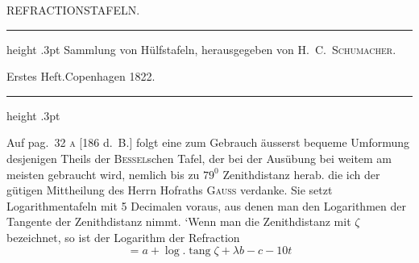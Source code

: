 \clearpage
\thispagestyle{empty}
%
\vspace*{2\baselineskip}
\begin{center}\large REFRACTIONSTAFELN.\end{center}
\begin{center}\parbox{.79\linewidth}{\centering\footnotesize\frenchspacing
\hrule height .3pt\relax\vspace{2.5pt}
Sammlung von Hülfstafeln, herausgegeben von H.\ C.\ \textsc{Schumacher}.\par
Erstes Heft.\quad Copenhagen 1822.\par
\vspace{2.5pt}\hrule height .3pt\relax
}\end{center}
\par\indent Auf pag.\ 32 \textsc{a} [186 d.\ B.] folgt eine zum Gebrauch äusserst bequeme Umformung desjenigen Theils der \textsc{Bessel}schen Tafel, der bei der Ausübung bei weitem am meisten gebraucht wird, nemlich bis zu $79^0$ Zenithdistanz herab. die ich der gütigen Mittheilung des Herrn Hofraths \textsc{Gauss} verdanke. Sie setzt Logarithmentafeln mit 5 Decimalen voraus, aus denen man den Logarithmen der Tangente der Zenithdistanz nimmt. `Wenn man die Zenithdistanz mit $\zeta$ bezeichnet, so ist der Logarithm der Refraction
\[
=a+\log.\operatorname{tang}\zeta+\lambda b-c-10t
\]

